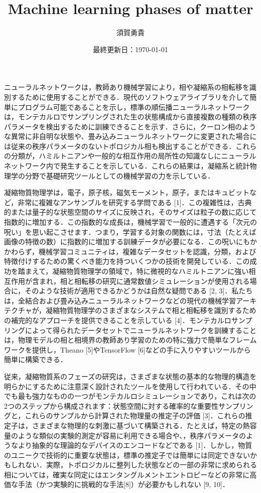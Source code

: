 \documentclass[a4paper,11pt]{jsarticle}
\begin{document}
\title{Machine learning phases of matter}
\author{須賀勇貴}
\date{最終更新日：\today}
\maketitle
ニューラルネットワークは，教師あり機械学習により，相や凝縮系の相転移を識別するために使用することができる．現代のソフトウェアライブラリを介して簡単にプログラム可能であることを示し，標準の順伝播ニューラルネットワークは，モンテカルロでサンプリングされた生の状態構成から直接複数の種類の秩序パラメータを検出するために訓練できることを示す．さらに，クーロン相のような異常に非自明な状態や、畳み込みニューラルネットワークに変更された場合には従来の秩序パラメータのないトポロジカル相も検出することができる．これらの分類が，ハミルトニアンや一般的な相互作用の局所性の知識なしにニューラルネットワーク内で発生することを示している．これらの結果は，凝縮系と統計物理学の分野で基礎研究ツールとしての機械学習の力を示している．\par

\newpage
凝縮物質物理学は，電子，原子核，磁気モーメント，原子，またはキュビットなど，非常に複雑なアンサンブルを研究する学問である [1]．この複雑性は，古典的または量子的な状態空間のサイズに反映され，そのサイズは粒子の数に応じて指数的に増加する．この指数的な成長は，機械学習で一般的に遭遇する「次元の呪い」を思い起こさせます．つまり，学習する対象の関数には，寸法（たとえば画像の特徴の数）に指数的に増加する訓練データが必要になる．この呪いにもかかわらず，機械学習コミュニティは，複雑なデータセットを認識，分類，および特徴付けするための驚くべき能力を持ついくつかの技術を開発している．この成功を踏まえて，凝縮物質物理学の領域で，特に微視的なハミルトニアンに強い相互作用が含まれ，相と相転移の研究に通常数値シミュレーションが使用される場合に，そのような技術が適用できるかどうかは自然な疑問である [2, 3]．私たちは，全結合および畳み込みニューラルネットワークなどの現代の機械学習アーキテクチャが，凝縮物質物理学のさまざまなシステムで相と相転移を識別するための補完的なアプローチを提供できることを示している [4]．モンテカルロサンプリングによって得られたデータセットでニューラルネットワークを訓練することは，物理モデルの相と相境界の教師あり学習のための特に強力で簡単なフレームワークを提供し，Theano [5]やTensorFlow [6]などの手に入りやすいツールから簡単に構築できる．\par
従来，凝縮物質系のフェーズの研究は，さまざまな状態の基本的な物理的構造を明らかにするために注意深く設計されたツールを使用して行われている．その中でも最も強力なものの一つがモンテカルロシミュレーションであり，これは次の2つのステップから構成されます：状態空間に対する確率的な重要性サンプリングと，これらのサンプルから計算された物理量の推定子の評価 [3]．これらの推定子は，さまざまな物理的な刺激に基づいて構築される．たとえば，特定の熱容量のような類似の実験的測定が容易に利用できる場合や、，秩序パラメータのようなより抽象的な理論的なデバイスのエンコードなどである [1]．しかし，物質のユニークで技術的に重要な状態は，標準の推定子では簡単には同定できないかもしれない．実際，トポロジカルに整列した状態などの一部の非常に求められる相については，確実な同定にはエンタングルメントエントロピーなどの非常に高価な手法（かつ実験的に挑戦的な手法[8]）が必要かもしれない [9, 10]．\par
\end{document}
